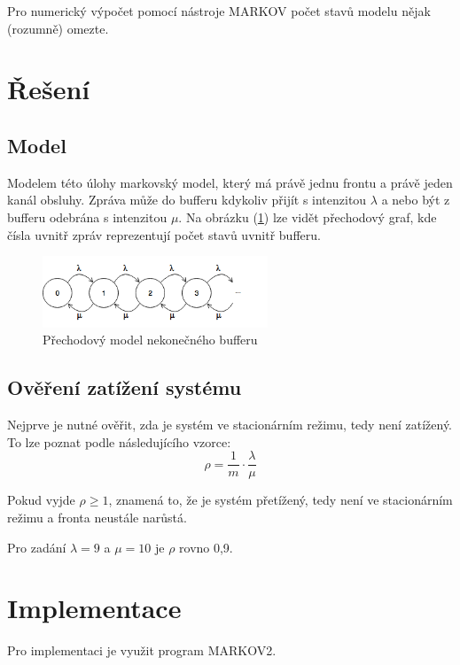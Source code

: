 \documentclass{article}
\begin{document}
Pro numerický výpočet pomocí nástroje MARKOV počet stavů modelu nějak (rozumně) omezte.
 
\section{Řešení}%


 \subsection{Model}%

Modelem této úlohy markovský model, který má právě jednu frontu a právě jeden kanál obsluhy. 
Zpráva může do bufferu kdykoliv přijít s intenzitou \( \lambda \) a nebo být z bufferu odebrána s intenzitou \( \mu \).
Na obrázku (\ref{fig:gull})  lze vidět přechodový graf, kde čísla uvnitř zpráv reprezentují počet stavů uvnitř bufferu.

\begin{figure}[ht]
  \centering
    \includegraphics[width=0.6\textwidth]{vss_buffer.png}
  \caption{Přechodový model nekonečného bufferu}
  \label{fig:gull}
\end{figure}

 \subsection{Ověření zatížení systému}
Nejprve je nutné ověřit, zda je systém ve stacionárním režimu, tedy není zatížený. To lze poznat podle následujícího vzorce:
$$
	\rho = \frac{1}{m}\cdot\frac{\lambda}{\mu}
$$

Pokud vyjde \(\rho \geq 1\), znamená to, že je systém přetížený, tedy není ve stacionárním režimu a fronta neustále narůstá.

Pro zadání \( \lambda = 9 \) a \( \mu = 10 \) je \(\rho\) rovno 0,9.

\section{Implementace}
Pro implementaci je využit program MARKOV2.
\end{document}

